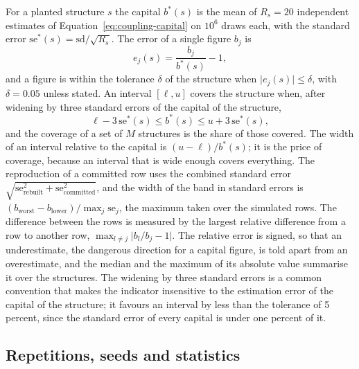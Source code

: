 For a planted structure $s$ the capital $b^\ast(s)$ is the mean of $R_s=20$ independent estimates of Equation~\ref{eq:coupling-capital}
on $10^6$ draws each, with the standard error $\mathrm{se}^\ast(s)=\mathrm{sd}/\sqrt{R_s}$. The error of a single figure $b_j$ is
\begin{equation}
e_j(s)=\frac{b_j}{b^\ast(s)}-1 ,
\label{eq:relative-error}
\end{equation}
and a figure is within the tolerance $\delta$ of the structure when $\lvert e_j(s)\rvert\le\delta$, with $\delta=0.05$ unless
stated. An interval $[\ell,u]$ covers the structure when, after widening by three standard errors of the capital of the structure,
\begin{equation}
\ell-3\,\mathrm{se}^\ast(s)\le b^\ast(s)\le u+3\,\mathrm{se}^\ast(s),
\label{eq:coverage-indicator}
\end{equation}
and the coverage of a set of $M$ structures is the share of those covered. The width of an interval relative to the capital is
$(u-\ell)/b^\ast(s)$; it is the price of coverage, because an interval that is wide enough covers everything. The reproduction of
a committed row uses the combined standard error $\sqrt{\mathrm{se}_{\mathrm{rebuilt}}^2+\mathrm{se}_{\mathrm{committed}}^2}$, and the
width of the band in standard errors is $(b_{\mathrm{worst}}-b_{\mathrm{lower}})/\max_j\mathrm{se}_j$, the maximum taken over the
simulated rows. The difference between the rows is measured by the largest relative difference from a row to another row,
$\max_{l\ne j}\lvert b_l/b_j-1\rvert$. The relative error is signed, so that an underestimate, the dangerous direction for a
capital figure, is told apart from an overestimate, and the median and the maximum of its absolute value summarise it over the
structures. The widening by three standard errors is a common convention that makes the indicator insensitive to the
estimation error of the capital of the structure; it favours an interval by less than the tolerance of 5 percent, since the
standard error of every capital is under one percent of it.

\subsection{Repetitions, seeds and statistics}
\label{sec:design-statistics}


